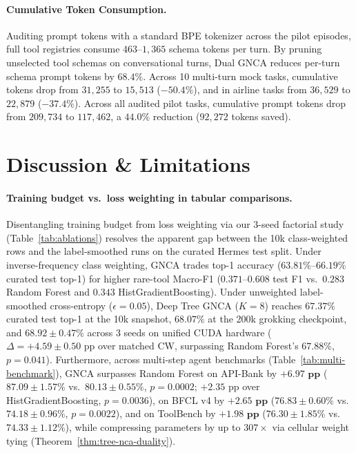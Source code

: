 \documentclass[10pt,twocolumn,letterpaper]{article}
\begin{document}
\paragraph{Cumulative Token Consumption.}
Auditing prompt tokens with a standard BPE tokenizer across the pilot episodes, full tool registries consume $463$--$1{,}365$ schema tokens per turn. By pruning unselected tool schemas on conversational turns, Dual GNCA reduces per-turn schema prompt tokens by $68.4\%$. Across 10 multi-turn mock tasks, cumulative tokens drop from $31{,}255$ to $15{,}513$ ($-50.4\%$), and in airline tasks from $36{,}529$ to $22{,}879$ ($-37.4\%$). Across all audited pilot tasks, cumulative prompt tokens drop from $209{,}734$ to $117{,}462$, a $\mathbf{44.0\%}$ reduction ($92{,}272$ tokens saved).

\section{Discussion \& Limitations}

\paragraph{Training budget vs.\ loss weighting in tabular comparisons.}
Disentangling training budget from loss weighting via our 3-seed factorial study (Table~\ref{tab:ablations}) resolves the apparent gap between the 10k class-weighted rows and the label-smoothed runs on the curated Hermes test split. Under inverse-frequency class weighting, GNCA trades top-1 accuracy ($63.81\%$--$66.19\%$ curated test top-1) for higher rare-tool Macro-F1 ($0.371$--$0.608$ test F1 vs.\ $0.283$ Random Forest and $0.343$ HistGradientBoosting). Under unweighted label-smoothed cross-entropy ($\epsilon=0.05$), Deep Tree GNCA ($K=8$) reaches $67.37\%$ curated test top-1 at the 10k snapshot, $68.07\%$ at the 200k grokking checkpoint, and $\mathbf{68.92 \pm 0.47\%}$ across 3 seeds on unified CUDA hardware ($\Delta = +4.59 \pm 0.50\text{ pp}$ over matched CW, surpassing Random Forest's $67.88\%$, $p=0.041$). Furthermore, across multi-step agent benchmarks (Table~\ref{tab:multi-benchmark}), GNCA surpasses Random Forest on API-Bank by $\mathbf{+6.97\text{ pp}}$ ($87.09 \pm 1.57\%$ vs.\ $80.13 \pm 0.55\%$, $p=0.0002$; $+2.35\text{ pp}$ over HistGradientBoosting, $p=0.0036$), on BFCL v4 by $\mathbf{+2.65\text{ pp}}$ ($76.83 \pm 0.60\%$ vs.\ $74.18 \pm 0.96\%$, $p=0.0022$), and on ToolBench by $\mathbf{+1.98\text{ pp}}$ ($76.30 \pm 1.85\%$ vs.\ $74.33 \pm 1.12\%$), while compressing parameters by up to $307\times$ via cellular weight tying (Theorem~\ref{thm:tree-nca-duality}).
\end{document}
